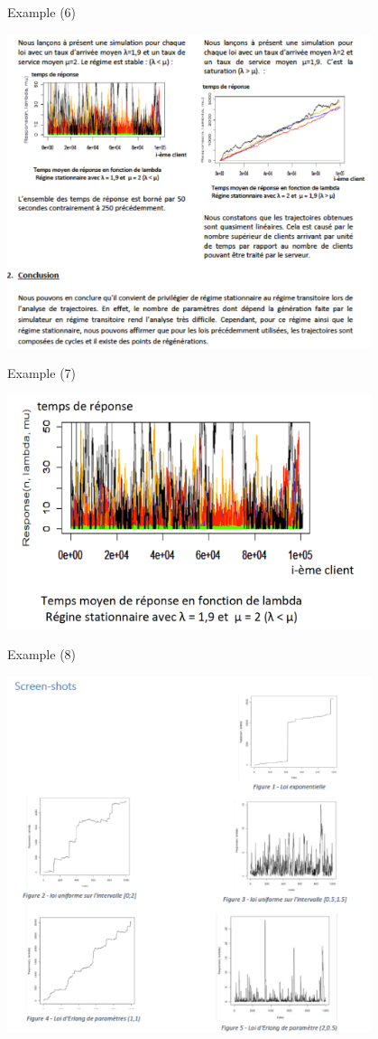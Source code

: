 \documentclass[xcolor=x11names,compress,8pt,fleqn]{beamer}
\renewcommand{\(}{\begin{columns}}
\renewcommand{\)}{\end{columns}}
\newcommand{\<}[1]{\begin{column}{#1}}
\renewcommand{\>}{\end{column}}
\begin{document}
\begin{frame}{Example (6)}
\begin{center}
\includegraphics[width=0.8\textwidth]{Example6}
\end{center}
\end{frame}
\begin{frame}{Example (7)}
\begin{center}
\includegraphics[width=0.8\textwidth]{Example7}
\end{center}
\end{frame}
\begin{frame}{Example (8)}
\begin{center}
\includegraphics[width=0.8\textwidth]{Example8}
\end{center}
\end{frame}
\end{document}
